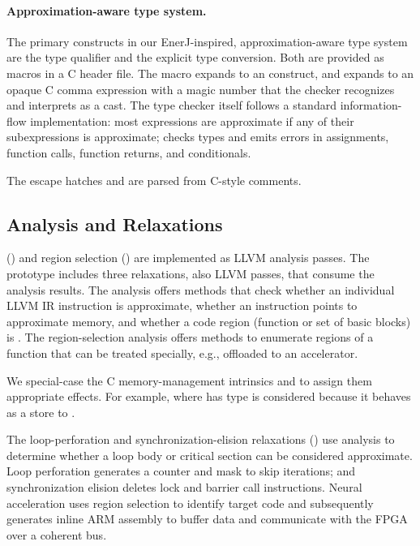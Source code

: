 \paragraph{Approximation-aware type system.}

The primary constructs in our EnerJ-inspired, approximation-aware type system
are the  type qualifier and the  explicit type
conversion. Both are provided as macros in a C header file. The
 macro expands to an  construct,
and  expands to an opaque C comma expression with a magic
number that the checker recognizes and interprets as a cast.
The type checker itself follows a standard information-flow implementation:
most expressions are approximate if any of their subexpressions is
approximate; \sysname checks types and emits errors in assignments, function
calls, function returns, and conditionals.

The escape hatches \annpermit and \annforbid are parsed from
C-style comments.

\subsection{Analysis and Relaxations}

\Precisepurity () and region selection
() are implemented as LLVM analysis passes. The \sysname
prototype includes three relaxations, also LLVM passes, that
consume the analysis results.
%
The \precisepurity analysis offers methods that check whether an individual LLVM
IR instruction is approximate, whether an instruction points to approximate
memory, and whether a code region (function or set of basic blocks) is \precisepure.
%
The region-selection analysis offers methods to enumerate \precisepure regions
of a function that can be treated specially, e.g., offloaded to an accelerator.

We special-case
the C memory-management intrinsics  and 
to assign them appropriate effects.
For example,  where  has type
 is
considered \precisepure because it behaves as a store to .

The loop-perforation and synchronization-elision relaxations
() use \precisepurity analysis to determine whether
a loop body or critical section can be considered approximate.
Loop perforation generates a counter and mask to skip iterations;
and synchronization elision deletes lock and barrier call instructions.
Neural acceleration uses region selection to identify target code and
subsequently generates inline ARM assembly to buffer data and communicate
with the FPGA over a coherent bus.

